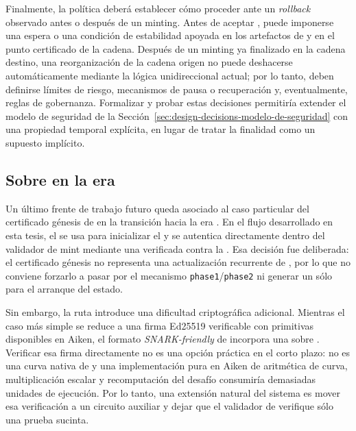 Finalmente, la política deberá establecer cómo proceder ante un \textit{rollback} observado antes o después de un minting. Antes de aceptar \MintTx, puede imponerse una espera o una condición de estabilidad apoyada en los artefactos de \Mithril y en el punto certificado de la cadena. Después de un minting ya finalizado en la cadena destino, una reorganización de la cadena origen no puede deshacerse automáticamente mediante la lógica unidireccional actual; por lo tanto, deben definirse límites de riesgo, mecanismos de pausa o recuperación y, eventualmente, reglas de gobernanza. Formalizar y probar estas decisiones permitiría extender el modelo de seguridad de la Sección~\ref{sec:design-decisions-modelo-de-seguridad} con una propiedad temporal explícita, en lugar de tratar la finalidad como un supuesto implícito.

\subsection{Sobre \texorpdfstring{\GenesisSignature}{GenesisSignature} en la era \texorpdfstring{\Lagrange}{Lagrange}}
\label{subsec:conclusions-and-future-work-sobre-genesissignature-en-la-era-lagrange}

Un último frente de trabajo futuro queda asociado al caso particular del certificado génesis de \Mithril en la transición hacia la era \Lagrange. En el flujo desarrollado en esta tesis, el \GenesisCertificate se usa para inicializar el \StakeDistributionUTxO y se autentica directamente dentro del validador de mint mediante una \GenesisSignature verificada contra la \GenesisVerificationKey. Esa decisión fue deliberada: el certificado génesis no representa una actualización recurrente de \STM, por lo que no conviene forzarlo a pasar por el mecanismo \texttt{phase1}/\texttt{phase2} ni generar un \ProofReceipt sólo para el arranque del estado.

Sin embargo, la ruta \Lagrange introduce una dificultad criptográfica adicional. Mientras el caso más simple se reduce a una firma Ed25519 verificable con primitivas disponibles en Aiken, el formato \textit{SNARK-friendly} de \Mithril incorpora una \StandardSchnorrSignature sobre \Jubjub. Verificar esa firma directamente \Onchain no es una opción práctica en el corto plazo: \Jubjub no es una curva nativa de \Cardano y una implementación pura en Aiken de aritmética de curva, multiplicación escalar y recomputación del desafío consumiría demasiadas unidades de ejecución. Por lo tanto, una extensión natural del sistema es mover esa verificación a un circuito auxiliar y dejar que el validador de \StakeDistribution verifique sólo una prueba sucinta.

